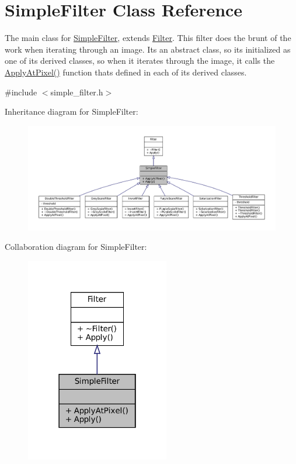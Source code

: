 \hypertarget{classSimpleFilter}{}\section{Simple\+Filter Class Reference}
\label{classSimpleFilter}


The main class for \hyperlink{classSimpleFilter}{Simple\+Filter}, extends \hyperlink{classFilter}{Filter}. This filter does the brunt of the work when iterating through an image. It\textquotesingle{}s an abstract class, so it\textquotesingle{}s initialized as one of it\textquotesingle{}s derived classes, so when it iterates through the image, it calls the \hyperlink{classSimpleFilter_ad47d7f994aa0f80f9013d689b82a0b92}{Apply\+At\+Pixel()} function that\textquotesingle{}s defined in each of it\textquotesingle{}s derived classes.  




{\ttfamily \#include $<$simple\+\_\+filter.\+h$>$}



Inheritance diagram for Simple\+Filter\+:\nopagebreak
\begin{figure}[H]
\begin{center}
\leavevmode
\includegraphics[width=350pt]{classSimpleFilter__inherit__graph}
\end{center}
\end{figure}


Collaboration diagram for Simple\+Filter\+:\nopagebreak
\begin{figure}[H]
\begin{center}
\leavevmode
\includegraphics[width=178pt]{classSimpleFilter__coll__graph}
\end{center}
\end{figure}
